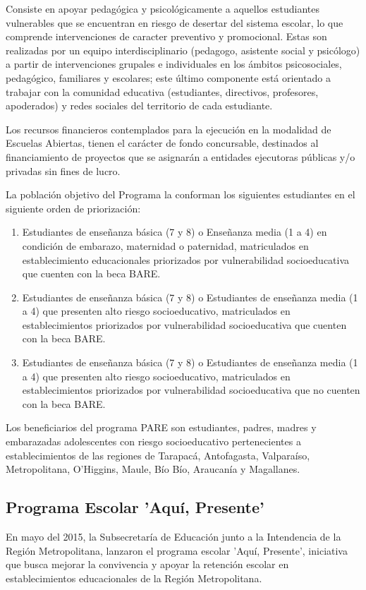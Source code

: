 Consiste en apoyar pedagógica y psicológicamente a aquellos estudiantes vulnerables que se encuentran en riesgo de desertar del sistema escolar, lo que comprende intervenciones de caracter preventivo y promocional. Estas son realizadas por un equipo interdisciplinario (pedagogo, asistente social y psicólogo) a partir de intervenciones grupales e individuales en los ámbitos psicosociales, pedagógico, familiares y escolares; este último componente está orientado a trabajar con la comunidad educativa (estudiantes, directivos, profesores, apoderados) y redes sociales del territorio de cada estudiante.

Los recursos financieros contemplados para la ejecución en la modalidad de Escuelas Abiertas, tienen el carácter de fondo concursable, destinados al financiamiento de proyectos que se asignarán a entidades ejecutoras públicas y/o privadas sin fines de lucro.

La población objetivo del Programa la conforman los siguientes estudiantes en el siguiente orden de priorización:
\begin{enumerate}
\item Estudiantes de enseñanza básica (7 y 8) o Enseñanza media (1 a 4) en condición de embarazo, maternidad o paternidad, matriculados en establecimiento educacionales priorizados por vulnerabilidad socioeducativa que cuenten con la beca BARE.
\item Estudiantes de enseñanza básica (7 y 8) o Estudiantes de enseñanza media (1 a 4) que presenten alto riesgo socioeducativo, matriculados en establecimientos priorizados por vulnerabilidad socioeducativa que cuenten con la beca BARE.
\item Estudiantes de enseñanza básica (7 y 8) o Estudiantes de enseñanza media (1 a 4) que presenten alto riesgo socioeducativo, matriculados en establecimientos priorizados por vulnerabilidad socioeducativa que no cuenten con la beca BARE.
\end{enumerate}

Los beneficiarios del programa PARE son estudiantes, padres, madres y embarazadas adolescentes con riesgo socioeducativo pertenecientes a establecimientos de las regiones de Tarapacá, Antofagasta, Valparaíso, Metropolitana, O'Higgins, Maule, Bío Bío, Araucanía y Magallanes. \cite{pare}

\subsection{Programa Escolar 'Aquí, Presente'}
En mayo del 2015, la Subsecretaría de Educación junto a la Intendencia de la Región Metropolitana, lanzaron el programa escolar 'Aquí, Presente', iniciativa que busca mejorar la convivencia y apoyar la retención escolar en establecimientos educacionales de la Región Metropolitana.

